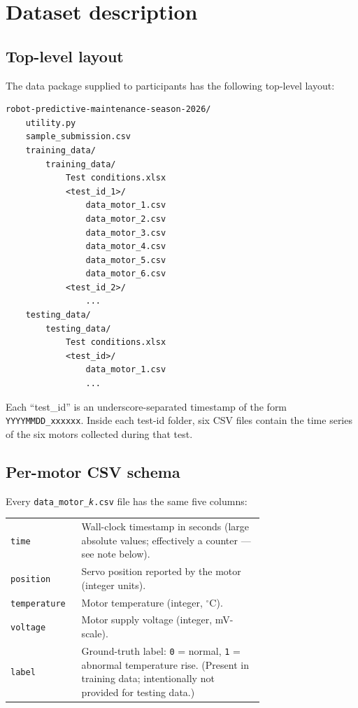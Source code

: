 \documentclass[11pt,a4paper]{article}
\begin{document}
\section{Dataset description}
\label{sec:data}

\subsection{Top-level layout}

The data package supplied to participants has the following top-level layout:

\begin{verbatim}
robot-predictive-maintenance-season-2026/
    utility.py
    sample_submission.csv
    training_data/
        training_data/
            Test conditions.xlsx
            <test_id_1>/
                data_motor_1.csv
                data_motor_2.csv
                data_motor_3.csv
                data_motor_4.csv
                data_motor_5.csv
                data_motor_6.csv
            <test_id_2>/
                ...
    testing_data/
        testing_data/
            Test conditions.xlsx
            <test_id>/
                data_motor_1.csv
                ...
\end{verbatim}

Each ``test\_id'' is an underscore-separated timestamp of the form
\texttt{YYYYMMDD\_xxxxxx}. Inside each test-id folder, six CSV files contain
the time series of the six motors collected during that test.

\subsection{Per-motor CSV schema}

Every \texttt{data\_motor\_\textit{k}.csv} file has the same five columns:

\begin{tabular}{@{}lp{0.72\linewidth}@{}}
\toprule
\texttt{time}        & Wall-clock timestamp in seconds (large absolute values; effectively a counter --- see note below). \\
\texttt{position}    & Servo position reported by the motor (integer units). \\
\texttt{temperature} & Motor temperature (integer, $^{\circ}$C). \\
\texttt{voltage}     & Motor supply voltage (integer, mV-scale). \\
\texttt{label}       & Ground-truth label: \texttt{0} = normal, \texttt{1} = abnormal temperature rise. (Present in training data; intentionally not provided for testing data.) \\
\bottomrule
\end{tabular}
\end{document}
